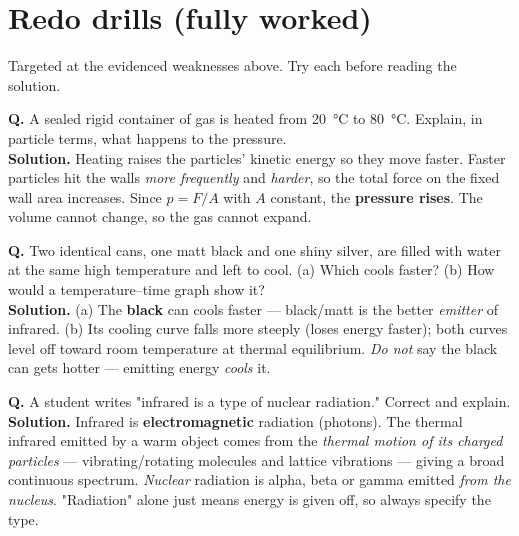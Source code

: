 \documentclass[11pt,a4paper]{article}
\begin{document}
\clearpage
\section{Redo drills (fully worked)}

Targeted at the evidenced weaknesses above. Try each before reading the solution.

\begin{keybox}
\textbf{Q.} A sealed rigid container of gas is heated from \SI{20}{\celsius} to
\SI{80}{\celsius}. Explain, in particle terms, what happens to the pressure. \\
\textbf{Solution.} Heating raises the particles' kinetic energy so they move faster. Faster
particles hit the walls \emph{more frequently} and \emph{harder}, so the total force on the
fixed wall area increases. Since $p=F/A$ with $A$ constant, the \textbf{pressure rises}.
The volume cannot change, so the gas cannot expand.
\end{keybox}

\begin{keybox}
\textbf{Q.} Two identical cans, one matt black and one shiny silver, are filled with water
at the same high temperature and left to cool. (a) Which cools faster? (b) How would a
temperature--time graph show it? \\
\textbf{Solution.} (a) The \textbf{black} can cools faster --- black/matt is the better
\emph{emitter} of infrared. (b) Its cooling curve falls more steeply (loses energy faster);
both curves level off toward room temperature at thermal equilibrium. \emph{Do not} say the
black can gets hotter --- emitting energy \emph{cools} it.
\end{keybox}

\begin{keybox}
\textbf{Q.} A student writes "infrared is a type of nuclear radiation." Correct and explain.
\\
\textbf{Solution.} Infrared is \textbf{electromagnetic} radiation (photons). The thermal
infrared emitted by a warm object comes from the \emph{thermal motion of its charged
particles} --- vibrating/rotating molecules and lattice vibrations --- giving a broad
continuous spectrum. \emph{Nuclear} radiation is alpha, beta or gamma emitted \emph{from the
nucleus}. "Radiation" alone just means energy is given off, so always specify the type.
\end{keybox}
\end{document}
